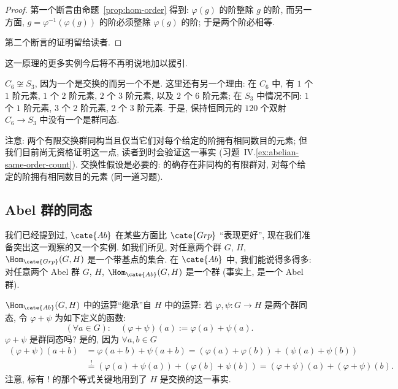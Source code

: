 \begin{proof}
第一个断言由命题~\ref{prop:hom-order} 得到: $\varphi(g)$ 的阶整除 $g$ 的阶, 而另一方面, $g = \varphi^{-1}(\varphi(g))$ 的阶必须整除 $\varphi(g)$ 的阶; 于是两个阶必相等.

第二个断言的证明留给读者.
\end{proof}

这一原理的更多实例今后将不再明说地加以援引.

\begin{example}
\label{ex:c6-not-s3}
$C_6 \not\cong S_3$, 因为一个是交换的而另一个不是. 这里还有另一个理由: 在 $C_6$ 中, 有 $1$ 个 $1$ 阶元素, $1$ 个 $2$ 阶元素, $2$ 个 $3$ 阶元素, 以及 $2$ 个 $6$ 阶元素; 在 $S_3$ 中情况不同: $1$ 个 $1$ 阶元素, $3$ 个 $2$ 阶元素, $2$ 个 $3$ 阶元素. 于是, 保持恒同元的 $120$ 个双射 $C_6 \rightarrow S_3$ 中没有一个是群同态.
\end{example}

注意: 两个有限交换群同构当且仅当它们对每个给定的阶拥有相同数目的元素; 但我们目前尚无资格证明这一点, 读者到时会验证这一事实 (习题~IV.\ref{ex:abelian-same-order-count}). 交换性假设是必要的: 的确存在非同构的有限群对, 对每个给定的阶拥有相同数目的元素 (同一道习题).

\subsection{Abel 群的同态}
\label{subsec:hom-abelian}

我们已经提到过, $\cate{Ab}$ 在某些方面比 $\cate{Grp}$ ``表现更好'', 现在我们准备突出这一观察的又一个实例. 如我们所见, 对任意两个群 $G$, $H$, $\Hom_{\cate{Grp}}(G, H)$ 是一个带基点的集合. 在 $\cate{Ab}$ 中, 我们能说得多得多: 对任意两个 Abel 群 $G$, $H$, $\Hom_{\cate{Ab}}(G, H)$ 是一个群 (事实上, 是一个 Abel 群).

$\Hom_{\cate{Ab}}(G, H)$ 中的运算``继承''自 $H$ 中的运算: 若 $\varphi, \psi : G \to H$ 是两个群同态, 令 $\varphi + \psi$ 为如下定义的函数:
\[
(\forall a \in G): \quad (\varphi + \psi)(a) := \varphi(a) + \psi(a).
\]
$\varphi + \psi$ 是群同态吗? 是的, 因为 $\forall a, b \in G$
\begin{align*}
(\varphi + \psi)(a + b) &= \varphi(a + b) + \psi(a + b) = (\varphi(a) + \varphi(b)) + (\psi(a) + \psi(b)) \\
&\overset{!}{=} (\varphi(a) + \psi(a)) + (\varphi(b) + \psi(b)) = (\varphi + \psi)(a) + (\varphi + \psi)(b).
\end{align*}
注意, 标有 $!$ 的那个等式关键地用到了 $H$ 是交换的这一事实.

